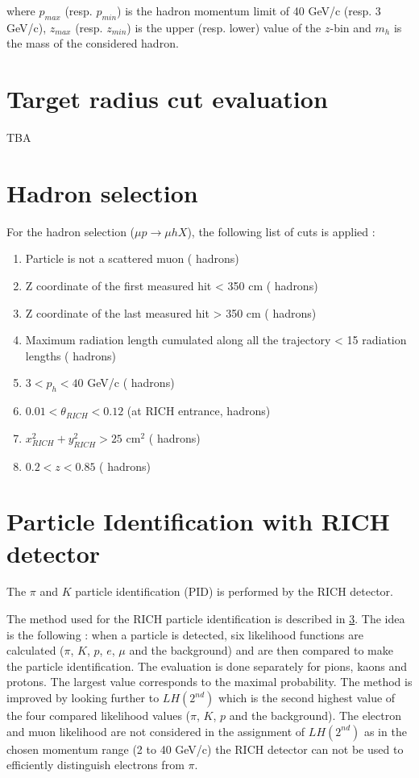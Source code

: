 where $p_{max}$ (resp. $p_{min}$) is the hadron momentum limit of 40 GeV/c (resp. 3 GeV/c), $z_{max}$ (resp. $z_{min}$)
is the upper (resp. lower) value of the $z$-bin and $m_h$ is the mass of the considered hadron.


\section{Target radius cut evaluation}

TBA


\section{Hadron selection}

For the hadron selection ($\mu p \rightarrow \mu hX$), the following list of cuts is applied :
\begin{enumerate}
  \item Particle is not a scattered muon ( hadrons)
  \item Z coordinate of the first measured hit < 350 cm ( hadrons)
  \item Z coordinate of the last measured hit > 350 cm ( hadrons)
  \item Maximum radiation length cumulated along all the trajectory < 15 radiation lengths ( hadrons)
  \item $3 < p_h < 40$ GeV/c ( hadrons)
  \item $0.01 < \theta_{RICH} < 0.12$ (at RICH entrance, hadrons)
  \item $x^2_{RICH} + y^2_{RICH} > 25$ cm$^2$ ( hadrons)
  \item $0.2 < z < 0.85$ ( hadrons)
\end{enumerate}


\section{Particle Identification with RICH detector}

The $\pi$ and $K$ particle identification (PID) is performed by the RICH detector.

The method used for the RICH particle identification is described in \ref{}. The idea is the following : when a particle
is detected, six likelihood functions are calculated ($\pi$, $K$, $p$, $e$, $\mu$ and the background) and are then
compared to make the particle identification. The evaluation is done separately for pions, kaons and protons. The largest
value corresponds to the maximal probability. The method is improved by looking further to $LH(2^{nd})$ which is the second
highest value of the four compared likelihood values ($\pi$, $K$, $p$ and the background). The electron and muon likelihood
are not considered in the assignment of $LH(2^{nd})$ as in the chosen momentum range (2 to 40 GeV/c) the RICH detector can
not be used to efficiently distinguish electrons from $\pi$.

